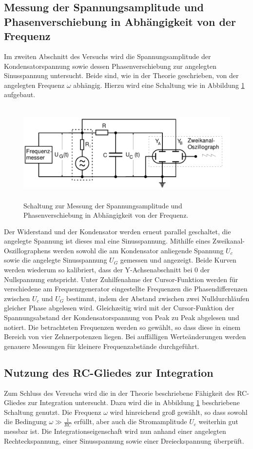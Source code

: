 \subsection{Messung der Spannungsamplitude und Phasenverschiebung in Abhängigkeit von der Frequenz}
Im zweiten Abschnitt des Versuchs wird die Spannungsamplitude der Kondensatorspannung sowie dessen Phasenverschiebung zur angelegten Sinusspannung untersucht.
Beide sind, wie in der Theorie geschrieben, von der angelegten Frequenz $\omega$ abhängig.
Hierzu wird eine Schaltung wie in Abbildung \ref{fig:aufbau_b} aufgebaut.
\begin{figure}[H]
  \centering
  \includegraphics[height=5cm]{aufbau_b.png}
  \caption{Schaltung zur Messung der Spannungsamplitude und Phasenverschiebung in Abhängigkeit von der Frequenz. \cite{sample}}
  \label{fig:aufbau_b}
\end{figure}
Der Widerstand und der Kondensator werden erneut parallel geschaltet, die angelegte Spannung ist dieses mal eine Sinusspannung.
Mithilfe eines Zweikanal-Oszillographens werden sowohl die am Kondensator anliegende Spannung $U_c$ sowie die angelegte Sinusspannung $U_G$ gemessen und angezeigt.
Beide Kurven werden wiederum so kalibriert, dass der Y-Achsenabschnitt bei 0 der Nullspannung entspricht.
Unter Zuhilfenahme der Cursor-Funktion werden für verschiedene am Frequenzgenerator eingestellte Frequenzen die Phasendifferenzen zwischen $U_c$ und $U_G$ bestimmt, indem der Abstand zwischen zwei Nulldurchläufen gleicher Phase abgelesen wird.
Gleichzeitig wird mit der Cursor-Funktion der Spannungsabstand der Kondensatorspannung von Peak zu Peak abgelesen und notiert.
Die betrachteten Frequenzen werden so gewählt, so dass diese in einem Bereich von vier Zehnerpotenzen liegen.
Bei auffälligen Werteänderungen werden genauere Messungen für kleinere Frequenzabstände durchgeführt.
\subsection{Nutzung des RC-Gliedes zur Integration}
Zum Schluss des Versuchs wird die in der Theorie beschriebene Fähigkeit des RC-Gliedes zur Integration untersucht.
Dazu wird die in Abbildung \ref{fig:aufbau_b} beschriebene Schaltung genutzt.
Die Frequenz $\omega$ wird hinreichend groß gewählt, so dass sowohl die Bedingung $ \omega \gg \frac{1}{RC}$ erfüllt, aber auch die Stromamplitude $U_c$ weiterhin gut messbar ist.
Die Integrationseigenschaft wird nun anhand einer angelegten Rechteckspannung, einer Sinusspannung sowie einer Dreieckspannung überprüft.
